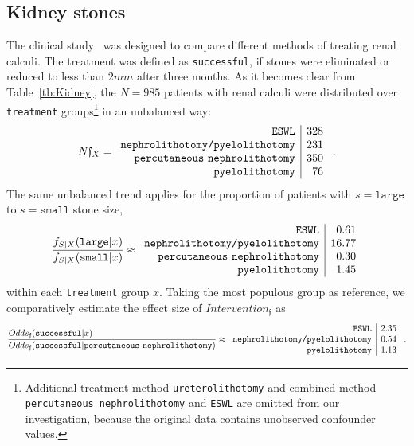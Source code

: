 \documentclass[10pt]{article}
\newcommand{\equ}[1]{\begin{gather} #1 \end{gather}}
\newcommand{\prob}[1]{\mathfrak{#1}}
\begin{document}
\subsection{Kidney stones}
\label{ssc:Kidney}


The clinical study~\cite{8e352ec3-c4c5-34a4-8ed5-ab6cf09d323f} was designed to compare different methods of
treating renal calculi.
The treatment was defined as \texttt{successful}, if stones were eliminated or reduced to less than $2mm$ after three months.
%
As it becomes clear from Table~\ref{tb:Kidney},
the $N = 985$ patients with renal calculi were distributed  over \texttt{treatment} groups\footnote{Additional treatment method \texttt{ureterolithotomy} and combined method \texttt{percutaneous nephrolithotomy} and \texttt{ESWL} are omitted from our investigation, because the original data contains unobserved confounder values.} in an unbalanced way:
\equ{
N \prob f_X = 
\begin{array}{r|r}
   \texttt{ESWL} & 328\\
   \texttt{nephrolithotomy/pyelolithotomy} & 231\\
    \texttt{percutaneous\,\,nephrolithotomy}  & 350\\
   \texttt{pyelolithotomy} & 76\\
\end{array}
~.
}
The same unbalanced trend applies for the proportion of patients with $s=\texttt{large}$ to $s=\texttt{small}$ stone size,
\equ{
\label{eq:Kidney:UnbalancedStones}
\frac{ f_{S\vert X}(\texttt{large} \vert x)}{ f_{S\vert X}(\texttt{small} \vert x)} \approx 
\begin{array}{r|r}
   \texttt{ESWL} & 0.61 \\
   \texttt{nephrolithotomy/pyelolithotomy} & 16.77 	 	\\
    \texttt{percutaneous\,\,nephrolithotomy}  & 0.30 \\
   \texttt{pyelolithotomy} & 1.45 	\\
\end{array}
}
within each \texttt{treatment} group $x$.
Taking the most populous group as reference, we comparatively estimate the effect size of $Intervention_{\prob f}$ as
\equ{
\label{eq:Kidney:Intervention}
\frac{Odds_{\prob f}(\texttt{successful}\vert x)\phantom{percutaneous..nephrolithotomy}}{Odds_{\prob f}(\texttt{successful}\vert \texttt{percutaneous\,\,nephrolithotomy})} \approx
\begin{array}{r|r}
   \texttt{ESWL} & 2.35 \\
   \texttt{nephrolithotomy/pyelolithotomy} & 0.54	 	\\
   \texttt{pyelolithotomy} & 1.13 	\\
\end{array}
~.
}
\end{document}
